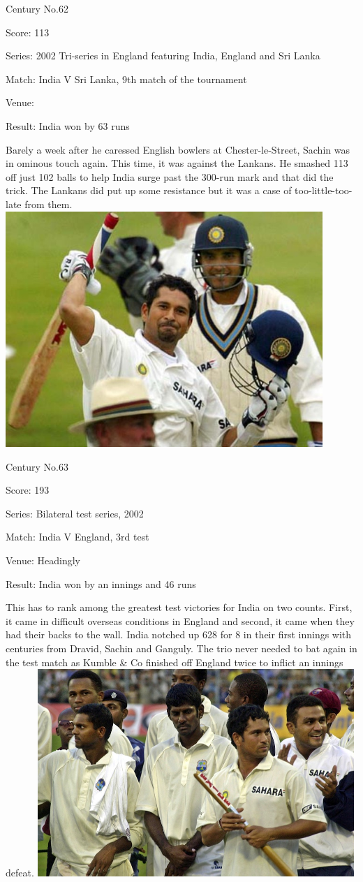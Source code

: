 \documentclass[11pt, a4paper]{article}
\begin{document}
Century No.62 

Score: 113 

Series: 2002 Tri-series in England featuring India, England and Sri Lanka 

Match: India V Sri Lanka, 9th match of the tournament 

Venue: 

Result: India won by 63 runs 

Barely a week after he caressed English bowlers at Chester-le-Street, Sachin was in ominous touch again. This time, it was against the Lankans. He smashed 113 off just 102 balls to help India surge past the 300-run mark and that did the trick. The Lankans did put up some resistance but it was a case of too-little-too-late from them.
\newpage
\includegraphics[width=0.9\textwidth]{pics/63.jpg}

Century No.63 

Score: 193 

Series: Bilateral test series, 2002 

Match: India V England, 3rd test 

Venue: Headingly 

Result: India won by an innings and 46 runs 

This has to rank among the greatest test victories for India on two counts. First, it came in difficult overseas conditions in England and second, it came when they had their backs to the wall. India notched up 628 for 8 in their first innings with centuries from Dravid, Sachin and Ganguly. The trio never needed to bat again in the test match as Kumble \& Co finished off England twice to inflict an innings defeat.
\newpage
\includegraphics[width=0.9\textwidth]{pics/64.jpg}
\end{document}
